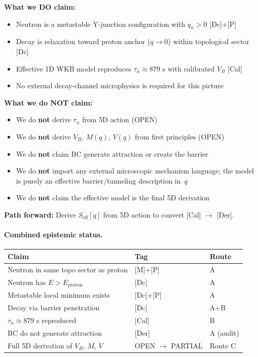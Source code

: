 \begin{tcolorbox}[colback=green!5!white, colframe=green!60!black,
                  title={\textbf{Convergence Statement: What We Claim and What We Don't}}]

\textbf{What we DO claim:}
\begin{itemize}[nosep]
  \item Neutron is a metastable Y-junction configuration with $q_n > 0$ [Dc]+[P]
  \item Decay is relaxation toward proton anchor ($q \to 0$) within topological sector [Dc]
  \item Effective 1D WKB model reproduces $\tau_n \approx 879$ s with calibrated $V_B$ [Cal]
  \item No external decay-channel microphysics is required for this picture
\end{itemize}

\textbf{What we do NOT claim:}
\begin{itemize}[nosep]
  \item We do \textbf{not} derive $\tau_n$ from 5D action (OPEN)
  \item We do \textbf{not} derive $V_B$, $M(q)$, $V(q)$ from first principles (OPEN)
  \item We do \textbf{not} claim BC generate attraction or create the barrier
  \item We do \textbf{not} import any external microscopic mechanism language; the model
        is purely an effective barrier/tunneling description in~$q$
  \item We do \textbf{not} claim the effective model is the final 5D derivation
\end{itemize}

\textbf{Path forward:} Derive $S_{\mathrm{eff}}[q]$ from 5D action to convert [Cal] $\to$ [Der].
\end{tcolorbox}

\paragraph{Combined epistemic status.}

\begin{center}
\begin{tabular}{lll}
\toprule
\textbf{Claim} & \textbf{Tag} & \textbf{Route} \\
\midrule
Neutron in same topo sector as proton & [M]+[P] & A \\
Neutron has $E > E_{\mathrm{proton}}$ & [Dc] & A \\
Metastable local minimum exists & [Dc]+[P] & A \\
Decay via barrier penetration & [Dc] & A+B \\
$\tau_n \approx 879$ s reproduced & [Cal] & B \\
\midrule
BC do not generate attraction & [Der] & A (audit) \\
Full 5D derivation of $V_B$, $M$, $V$ & OPEN $\to$ PARTIAL & Route C \\
\bottomrule
\end{tabular}
\end{center}

